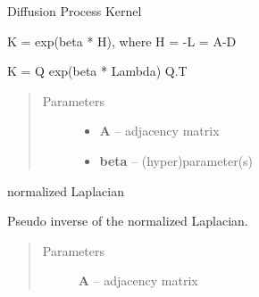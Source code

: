\documentclass[letterpaper,10pt,english]{sphinxmanual}
\begin{document}

\begin{fulllineitems}
\label{pyGPs.GraphExtension:pyGPs.GraphExtension.nodeKernels.diffKernel}
Diffusion Process Kernel

K = exp(beta * H), where H = -L = A-D

K = Q exp(beta * Lambda) Q.T
\begin{quote}\begin{description}
\item[{Parameters}] \leavevmode\begin{itemize}
\item {} 
\textbf{A} -- adjacency matrix

\item {} 
\textbf{beta} -- (hyper)parameter(s)

\end{itemize}

\end{description}\end{quote}

\end{fulllineitems}


\begin{fulllineitems}
\label{pyGPs.GraphExtension:pyGPs.GraphExtension.nodeKernels.normLap}
normalized Laplacian

\end{fulllineitems}


\begin{fulllineitems}
\label{pyGPs.GraphExtension:pyGPs.GraphExtension.nodeKernels.normalizeKernel}
\end{fulllineitems}


\begin{fulllineitems}
\label{pyGPs.GraphExtension:pyGPs.GraphExtension.nodeKernels.psInvLapKernel}
Pseudo inverse of the normalized Laplacian.
\begin{quote}\begin{description}
\item[{Parameters}] \leavevmode
\textbf{A} -- adjacency matrix

\end{description}\end{quote}

\end{fulllineitems}
\end{document}
